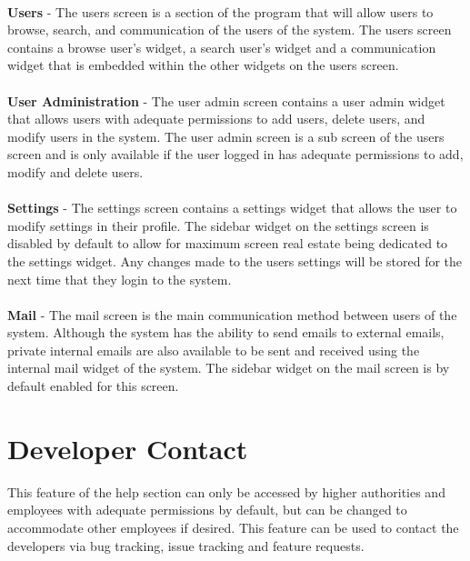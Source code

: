 \documentclass[letterpaper,12pt]{report}
\begin{document}
\paragraph*{}\hspace{0.6cm}\textbf{Users} - The users screen is a section of the program that will allow users to browse, search, and communication of the users of the system. The users screen contains a browse user’s widget, a search user’s widget and a communication widget that is embedded within the other widgets on the users screen.

\paragraph*{}\hspace{0.6cm}\textbf{User Administration} - The user admin screen contains a user admin widget that allows users with adequate permissions to add users, delete users, and modify users in the system. The user admin screen is a sub screen of the users screen and is only available if the user logged in has adequate permissions to add, modify and delete users.

\paragraph*{}\hspace{0.6cm}\textbf{Settings} - The settings screen contains a settings widget that allows the user to modify settings in their profile. The sidebar widget on the settings screen is disabled by default to allow for maximum screen real estate being dedicated to the settings widget. Any changes made to the users settings will be stored for the next time that they login to the system.

\paragraph*{}\hspace{0.6cm}\textbf{Mail} - The mail screen is the main communication method between users of the system. Although the system has the ability to send emails to external emails, private internal emails are also available to be sent and received using the internal mail widget of the system. The sidebar widget on the mail screen is by default enabled for this screen.
\pagebreak
\section{Developer Contact}
	This feature of the help section can only be accessed by higher authorities and employees with adequate permissions by default, but can be changed to accommodate other employees if desired. This feature can be used to contact the developers via bug tracking, issue tracking and feature requests. 
\end{document}
